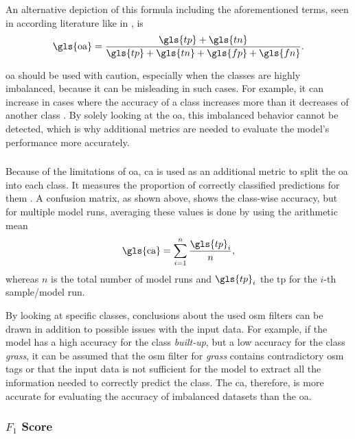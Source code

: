 An alternative depiction of this formula including the aforementioned terms, seen in according literature like in \textcite{Tzepkenlis.Marthoglou.ea2023,Zhao.Tu.ea2023}, is
\begin{equation}
    \text{\gls{oa}} = \frac{\gls{tp} + \gls{tn}}{\gls{tp} + \gls{tn} + \gls{fp}+ \gls{fn}}.
\end{equation}

\gls{oa} should be used with caution, especially when the classes are highly imbalanced, because it can be misleading in such cases. For example, it can increase in cases where the accuracy of a class increases more than it decreases of another class \autocite{Chicco.Jurman2020,Powers.Ailab2011}. By solely looking at the \gls{oa}, this imbalanced behavior cannot be detected, which is why additional metrics are needed to evaluate the model's performance more accurately.

\subsubsection*{}

Because of the limitations of \gls{oa}, \gls{ca} is used as an additional metric to split the \gls{oa} into each class. It measures the proportion of correctly classified predictions for them \autocite{Fawcett2006}. A confusion matrix, as shown above, shows the class-wise accuracy, but for multiple model runs, averaging these values is done by using the arithmetic mean
\begin{equation}
    \text{\gls{ca}} = \sum_{i=1}^n \frac{\gls{tp}_i}{n},
\end{equation}
whereas \( n \) is the total number of model runs and \( \gls{tp}_i \) the \gls{tp} for the \( i \)-th sample/model run.

By looking at specific classes, conclusions about the used \gls{osm} filters can be drawn in addition to possible issues with the input data. For example, if the model has a high accuracy for the class \emph{built-up}, but a low accuracy for the class \emph{grass}, it can be assumed that the \gls{osm} filter for \emph{grass} contains contradictory \gls{osm} tags or that the input data is not sufficient for the model to extract all the information needed to correctly predict the class. The \gls{ca}, therefore, is more accurate for evaluating the accuracy of imbalanced datasets than the \gls{oa}. 

\subsubsection*{\( F_{1} \) Score}

